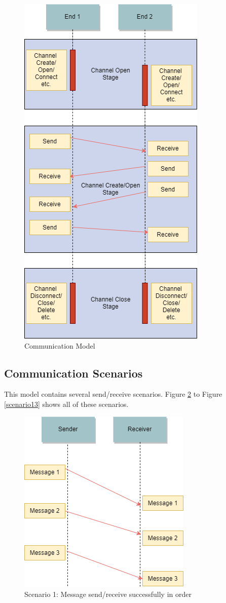 \begin{figure}[h]
\centerline{\includegraphics[scale=0.6]{Figures/communicationhappen}}
 \caption{Communication Model}
\label{communicationhappen}
\end{figure}

\subsection{Communication Scenarios}
This model contains several send/receive scenarios. Figure \ref{scenario1} to Figure \ref{scenario13} shows all of these scenarios.

\begin{figure}[ht!]
\centerline{\includegraphics[scale=0.6]{Figures/scenario1}}
 \caption{Scenario 1: Message send/receive successfully in order}
\label{scenario1}
\end{figure}

